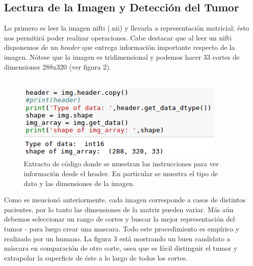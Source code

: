 \documentclass[conference]{IEEEtran}
\begin{document}
\subsection{Lectura de la Imagen y Detección del Tumor}
Lo primero es leer la imagen nifti (.nii) y llevarla a representación matricial; ésto nos permitirá poder realizar operaciones. Cabe destacar que al leer un nifti disponemos de un \textit{header} que entrega información importante respecto de la imagen. Nótese que la imagen es tridimensional y podemos hacer 33 cortes de dimensiones 288x320 (ver figura 2).\\\\
\begin{figure}
\begin{center}
\includegraphics[scale=0.5]{img/header.png} 
\caption{Extracto de código donde se muestran las instrucciones para ver información desde el header. En particular se muestra el tipo de dato y las dimensiones de la imagen.}
\end{center}
\end{figure}
Como se mencionó anteriormente, cada imagen corresponde a casos de distintos pacientes, por lo tanto las dimensiones de la matriz pueden variar. Más aún debemos seleccionar un rango de cortes y buscar la mejor representación del tumor - para luego crear una mascara. Todo este procedimiento es empírico y realizado por un humano. La figura 3 está mostrando un buen candidato a máscara en comparación de otro corte, osea que es fácil distinguir el tumor y extrapolar la superficie de éste a lo largo de todos los cortes.
\end{document}
